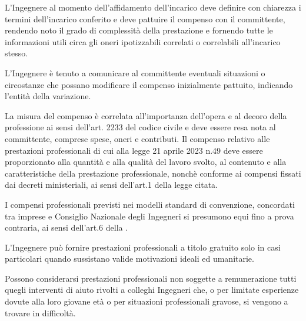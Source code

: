 \documentclass[letterpaper,10pt,italian]{sphinxmanual}
\begin{document}
\label{\detokenize{capitoli/codice/codice_deontologico:articolo-11-incarichi-e-compensi}}\begin{description}
\sphinxAtStartPar
L’Ingegnere al momento dell’affidamento dell’incarico deve definire con chiarezza i termini dell’incarico conferito e deve pattuire il compenso con il committente, rendendo noto il grado di complessità della prestazione e fornendo tutte le informazioni utili circa gli oneri ipotizzabili correlati o correlabili all’incarico stesso.

\sphinxAtStartPar
L’Ingegnere è tenuto a comunicare al committente eventuali situazioni o circostanze che possano modificare il compenso inizialmente pattuito, indicando l’entità della variazione.

\sphinxAtStartPar
La misura del compenso è correlata all’importanza dell’opera e al decoro della professione ai sensi dell’art. 2233 del codice civile e deve essere resa nota al committente, comprese spese, oneri e contributi. Il compenso relativo alle prestazioni professionali di cui alla legge 21 aprile 2023 n.49 deve essere proporzionato alla quantità e alla qualità del lavoro svolto, al contenuto e alla caratteristiche della prestazione professionale, nonchè conforme ai compensi fissati dai decreti ministeriali, ai sensi dell’art.1 della legge citata.

\sphinxAtStartPar
I compensi professionali previsti nei modelli standard di convenzione, concordati tra imprese e Consiglio Nazionale degli Ingegneri si presumono equi fino a prova contraria, ai sensi dell’art.6 della .

\sphinxAtStartPar
L’Ingegnere può fornire prestazioni professionali a titolo gratuito solo in casi particolari quando sussistano valide motivazioni ideali ed umanitarie.

\sphinxAtStartPar
Possono considerarsi prestazioni professionali non soggette a remunerazione tutti quegli interventi di aiuto rivolti a colleghi Ingegneri che, o per limitate esperienze dovute alla loro giovane età o per situazioni professionali gravose, si vengono a trovare in difficoltà.

\end{description}
\end{document}
